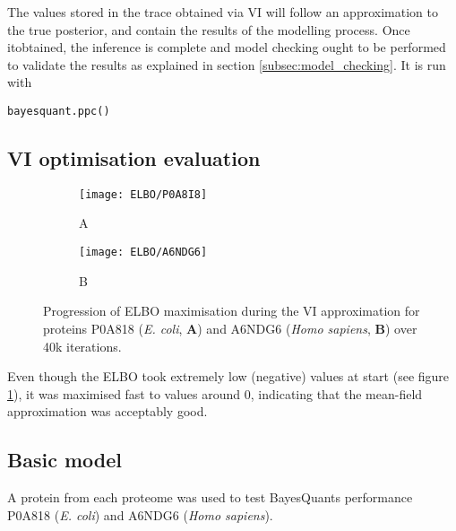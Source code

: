 The values stored in the trace obtained via VI will follow an approximation to the true posterior, and contain the results of the modelling process. Once it\textquotesingle obtained, the inference is complete and model checking ought to be performed to validate the results as explained in section \ref{subsec:model_checking}. It is run with

\begin{verbatim}
bayesquant.ppc()
\end{verbatim}


\subsection{VI optimisation evaluation}


\begin{figure}[H]
\begin{subfigure}{.45\textwidth}
\centering
\caption*{A}
\texttt{[image: ELBO/P0A8I8]}
\end{subfigure}
\begin{subfigure}{.45\textwidth}
\centering
\caption*{B}
\texttt{[image: ELBO/A6NDG6]}
\end{subfigure}
\caption{Progression of \ac{ELBO} maximisation during the \ac{VI} approximation for proteins P0A818 (\textit{E. coli}, \textbf{A}) and A6NDG6 (\textit{Homo sapiens}, \textbf{B}) over 40k iterations.}
\label{fig:ELBO}
\end{figure}

Even though the ELBO took extremely low (negative) values at start (see figure \ref{fig:ELBO}), it was maximised fast to values around 0, indicating that the mean-field approximation was acceptably good.

\subsection{Basic model}
\label{subsec:basic_model}

A protein from each proteome was used to test BayesQuant\textquotesingle s performance P0A818 (\textit{E. coli}) and A6NDG6 (\textit{Homo sapiens}).

